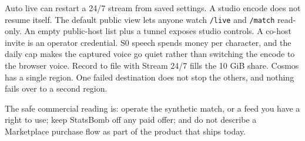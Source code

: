 \documentclass[11pt]{article}
\begin{document}
Auto live can restart a 24/7 stream from saved settings.
A studio encode does not resume itself.
The default public view lets anyone watch \texttt{/live} and \texttt{/match} read-only.
An empty public-host list plus a tunnel exposes studio controls.
A co-host invite is an operator credential.
S0 speech spends money per character, and the daily cap makes the captured voice
go quiet rather than switching the encode to the browser voice.
Record to file with Stream 24/7 fills the 10 GiB share.
Cosmos has a single region.
One failed destination does not stop the others, and nothing fails over to a
second region.

The safe commercial reading is: operate the synthetic match, or a feed you have
a right to use; keep StatsBomb off any paid offer; and do not describe a
Marketplace purchase flow as part of the product that ships today.
\end{document}
